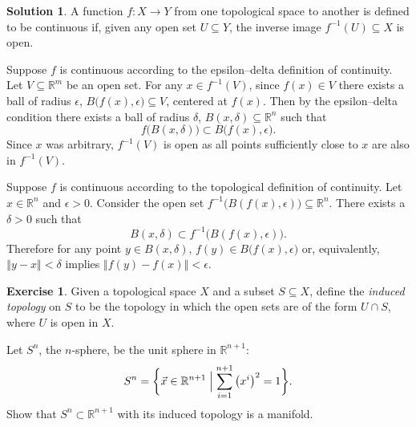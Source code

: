 \documentclass[11pt, a4paper]{report}
\theoremstyle{definition}
\newtheorem{ex}{Exercise}[part]
\newtheorem{sol}{Solution}[part]
\newcommand*{\norm}[1]{\ensuremath{\left\Vert#1\right\Vert}}
\begin{document}
\begin{sol}

A function $f: X \to Y$ from one topological space to another is defined to be continuous if, given any open set $U \subseteq Y$, the inverse image $f^{-1}(U) \subseteq X$ is open.

Suppose $f$ is continuous according to the epsilon--delta definition of continuity.
Let $V \subseteq \mathbb{R}^m$ be an open set.
For any $x \in f^{-1}(V)$, since $f(x) \in V$ there exists a ball of radius $\epsilon$, $B \bigl( f(x), \epsilon \bigr) \subseteq V$, centered at $f(x)$.
Then by the epsilon--delta condition there exists a ball of radius $\delta$, $B(x, \delta) \subseteq \mathbb{R}^n$ such that
\[
    f \bigl( B(x, \delta) \bigr) \subset B \bigl( f(x), \epsilon \bigr).
\]
Since $x$ was arbitrary, $f^{-1}(V)$ is open as all points sufficiently close to $x$ are also in $f^{-1}(V)$.

Suppose $f$ is continuous according to the topological definition of continuity.
Let $x \in \mathbb{R}^n$ and $\epsilon > 0$.
Consider the open set $f^{-1} \bigl( B(f(x), \epsilon) \bigr) \subseteq \mathbb{R}^n$.
There exists a $\delta > 0$ such that
\[
    B(x, \delta) \subset f^{-1} \bigl( B(f(x), \epsilon) \bigr).
\]
Therefore for any point $y \in B(x,\delta)$, $f(y) \in B \bigl( f(x), \epsilon \bigr)$ or, equivalently, $\norm{y - x} < \delta$ implies $\norm{f(y) - f(x)} < \epsilon$.

\end{sol}

\begin{ex}

Given a topological space $X$ and a subset $S \subseteq X$, define the \emph{induced topology} on $S$ to be the topology in which the open sets are of the form $U \cap S$, where $U$ is open in $X$.

Let $S^n$, the $n$-sphere, be the unit sphere in $\mathbb{R}^{n + 1}$:
\[
    S^n = \biggl\{\vec{x} \in \mathbb{R}^{n + 1} \Bigm| \sum_{i = 1}^{n + 1} {\bigl(x^i\bigr)}^2 = 1 \biggr\}.
\]
Show that $S^n \subset \mathbb{R}^{n + 1}$ with its induced topology is a manifold.

\end{ex}
\end{document}
